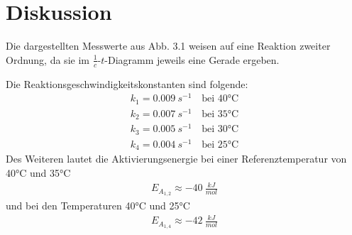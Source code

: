 \chapter{Diskussion}
	Die dargestellten Messwerte aus Abb. 3.1 weisen auf eine Reaktion zweiter Ordnung, da sie im $ \frac{1}{c} $-$ t $-Diagramm
	jeweils eine Gerade ergeben.\par\medskip
	Die Reaktionsgeschwindigkeitskonstanten sind folgende:
	\begin{align*}
		k_1=\SI{0,009}{s^{-1}} \quad \text{bei 40°C}\\
		k_2=\SI{0,007}{s^{-1}} \quad \text{bei 35°C}\\
		k_3=\SI{0,005}{s^{-1}} \quad \text{bei 30°C}\\
		k_4=\SI{0,004}{s^{-1}} \quad \text{bei 25°C}
	\end{align*}
	Des Weiteren lautet die Aktivierungsenergie bei einer Referenztemperatur von 40°C und 35°C
	\begin{align*}
	E_{A_{1,2}} \approx \SI{-40}{\frac{kJ}{mol}}
	\end{align*}
	und bei den Temperaturen 40°C und 25°C
	\begin{align*}
	E_{A_{1,4}} \approx \SI{-42}{\frac{kJ}{mol}}
	\end{align*}